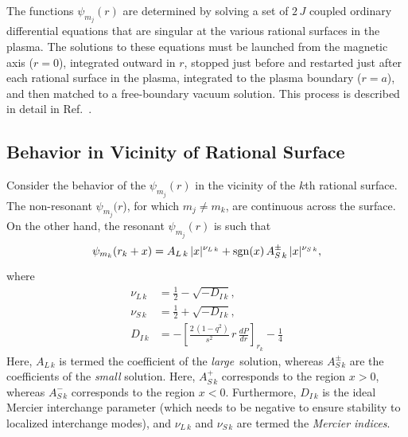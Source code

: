 \documentclass[12pt,prb,aps]{revtex4-1}
\begin{document}
The functions $\psi_{m_j}(r)$ are determined by solving a set of $2\,J$ coupled ordinary differential equations that are singular at the
various rational surfaces in the plasma. The solutions to these equations must be launched from the magnetic axis ($r=0$), integrated outward in $r$, stopped   just before and  restarted just after each rational surface in the plasma, integrated to the plasma boundary ($r=a$), and then matched to a free-boundary vacuum
solution. This process is described in detail in Ref.~. 

\subsection{Behavior in Vicinity of Rational Surface}\label{rational}
Consider the behavior of the $\psi_{m_j}(r)$ in the vicinity of the $k$th rational surface. 
The non-resonant $\psi_{m_j}(r$), for which $m_j\neq m_k$,   are continuous across the surface. On the other hand, the resonant $\psi_{m_j}(r)$ is
such that
\begin{align}\label{rat}
\psi_{m_k}(r_k+x) &= A_{L\,k}\,|x|^{\nu_{L\,k}} + {\rm sgn}(x)\,A_{S\,k}^{\pm}\,|x|^{\nu_{S\,k}},\\[0.5ex]
\end{align}
where
\begin{align}
\nu_{L\,k} &= \frac{1}{2}-\sqrt{-D_{I\,k}},\\[0.5ex]
\nu_{S\,k} &= \frac{1}{2}+\sqrt{-D_{I\,k}},\\[0.5ex]
D_{I\,k}&= - \left[\frac{2\,(1-q^2)}{s^2}\,r\,\frac{dP}{dr}\right]_{r_k} -\frac{1}{4}\label{di}
\end{align}
Here,  $A_{L\,k}$ is termed the coefficient of the {\em large}\, solution, whereas $A_{S\,k}^\pm$ are the coefficients of the {\em small}\/ solution.
Here, $A_{S\,k}^+$ corresponds to the region $x>0$, whereas  $A_{S\,k}^-$ corresponds to the region $x<0$. Furthermore, $D_{I\,k}$ is the ideal
Mercier interchange parameter (which needs to be negative to ensure stability to localized interchange modes),\cite{mercier,ggj,ggj1} and $\nu_{L\,k}$ and $\nu_{S\,k}$
are termed the {\em Mercier indices}. 
\end{document}
